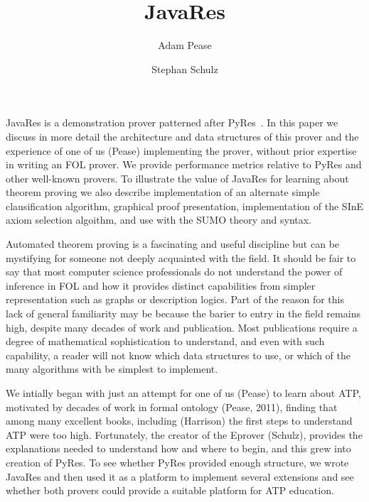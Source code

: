 \documentclass{llncs}
\title{JavaRes}
\author{Adam Pease\inst{2}
        \and Stephan Schulz\inst{1}
  }
\institute{
  Articulate Software, USA,
  \email{\tt apease@articulatesoftware.com}
  \and
  DHBW Stuttgart, Germany,
  \email{\tt schulz@eprover.org}
}
\begin{document}
\maketitle


JavaRes is a demonstration prover patterned after
PyRes~\cite{SP:IJCAR-2020}.  In this paper we discuss in more detail
the architecture and data structures of this prover and the experience
of one of us (Pease) implementing the prover, without prior expertise
in writing an FOL prover.  We provide performance metrics relative to
PyRes and other well-known provers.  To illustrate the value of
JavaRes for learning about theorem proving we also describe
implementation of an alternate simple clausification algorithm,
graphical proof presentation, implementation of the SInE axiom
selection algoithm, and use with the SUMO theory and syntax.

Automated theorem proving is a fascinating and useful discipline but
can be mystifying for someone not deeply acquainted with the field.
It should be fair to say that most computer science professionals do
not understand the power of inference in FOL and how it provides
distinct capabilities from simpler representation such as graphs or
description logics.  Part of the reason for this lack of general
familiarity may be because the barier to entry in the field remains
high, despite many decades of work and publication.  Most publications
require a degree of mathematical sophistication to understand, and
even with such capability, a reader will not know which data
structures to use, or which of the many algorithms with be simplest to
implement.



We intially began with just an attempt for one of us (Pease) to learn
about ATP, motivated by decades of work in formal ontology (Pease,
2011), finding that among many excellent books, including (Harrison)
the first steps to understand ATP were too high.  Fortunately, the
creator of the Eprover (Schulz), provides the explanations needed to
understand how and where to begin, and this grew into creation of
PyRes.  To see whether PyRes provided enough structure, we wrote
JavaRes and then used it as a platform to implement several extensions
and see whether both provers could provide a suitable platform for ATP
education.



\end{document}
